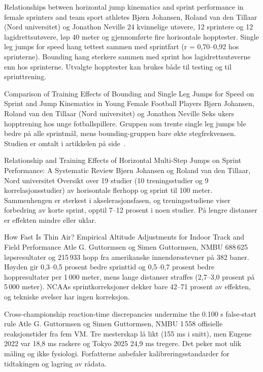   {Relationships between horizontal jump kinematics and sprint performance in female sprinters and team sport athletes}
  {Bjørn Johansen, Roland van den Tillaar (Nord universitet) og Jonathon Neville}
  {24 kvinnelige utøvere, 12 sprintere og 12 lagidrettsutøvere, løp 40 meter og gjennomførte fire horisontale hopptester. Single leg jumps for speed hang tettest sammen med sprintfart (r = 0,70–0,92 hos sprinterne). Bounding hang sterkere sammen med sprint hos lagidrettsutøverne enn hos sprinterne. Utvalgte hopptester kan brukes både til testing og til sprinttrening.}

  {Comparison of Training Effects of Bounding and Single Leg Jumps for Speed on Sprint and Jump Kinematics in Young Female Football Players}
  {Bjørn Johansen, Roland van den Tillaar (Nord universitet) og Jonathon Neville}
  {Seks ukers hopptrening hos unge fotballspillere. Gruppen som trente single leg jumps ble bedre på alle sprintmål, mens bounding-gruppen bare økte stegfrekvensen. Studien er omtalt i artikkelen på side~\pageref{art:singleleg}.}

  {Relationship and Training Effects of Horizontal Multi-Step Jumps on Sprint Performance: A Systematic Review}
  {Bjørn Johansen og Roland van den Tillaar, Nord universitet}
  {Oversikt over 19 studier (10 treningsstudier og 9 korrelasjonsstudier) av horisontale flerhopp og sprint til 100 meter. Sammenhengen er sterkest i akselerasjonsfasen, og treningsstudiene viser forbedring av korte sprint, opptil 7–12 prosent i noen studier. På lengre distanser er effekten mindre eller uklar.}

  {How Fast Is Thin Air? Empirical Altitude Adjustments for Indoor Track and Field Performance}
  {Atle G. Guttormsen og Simen Guttormsen, NMBU}
  {688\,625 løpsresultater og 215\,933 hopp fra amerikanske innendørsstevner på 382 baner. Høyden gir 0,3–0,5 prosent bedre sprinttid og 0,5–0,7 prosent bedre hoppresultater per 1\,000 meter, mens lange distanser straffes (2,7–3,0 prosent på 5\,000 meter). NCAAs sprintkorreksjoner dekker bare 42–71 prosent av effekten, og tekniske øvelser har ingen korreksjon.}

  {Cross-championship reaction-time discrepancies undermine the 0.100 s false-start rule}
  {Atle G. Guttormsen og Simen Guttormsen, NMBU}
  {1\,558 offisielle reaksjonstider fra fem VM. Tre mesterskap lå likt (155 ms i snitt), men Eugene 2022 var 18,8 ms raskere og Tokyo 2025 24,9 ms tregere. Det peker mot ulik måling og ikke fysiologi. Forfatterne anbefaler kalibreringsstandarder for tidtakingen og lagring av rådata.}
\clearpage
